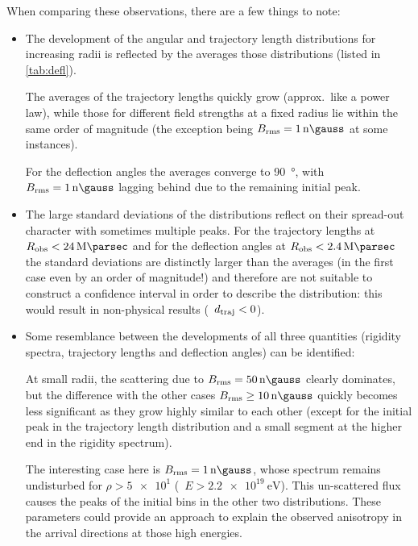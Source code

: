 When comparing these observations, there are a few things to note:
\begin{itemize}
    \item The development of the angular and trajectory length distributions
        for increasing radii is reflected by the averages those distributions
        (listed in \cref{tab:defl}).

        The averages of the trajectory lengths quickly grow (approx.~like a
        power law), while those for different field strengths at a fixed radius
        lie within the same order of magnitude (the exception being
        $\Brms=\SI{1}{\nano\gauss}$ at some instances).

        For the deflection angles the averages converge to \SI{90}{\degree},
        with $\Brms=\SI{1}{\nano\gauss}$ lagging behind due to the remaining
        initial peak.

    \item The large standard deviations of the distributions reflect on their
        spread-out character with sometimes multiple peaks. For the trajectory
        lengths at $\Robserver<\SI{24}{\mega\parsec}$ and for the deflection
        angles at $\Robserver<\SI{2.4}{\mega\parsec}$ the standard deviations
        are distinctly larger than the averages (in the first case even by an
        order of magnitude!) and therefore are not suitable to construct a
        confidence interval in order to describe the distribution: this would
        result in non-physical results (\ie~$d_{\mathrm{traj}}<0$).

    \item Some resemblance between the developments of all three quantities
        (rigidity spectra, trajectory lengths and deflection angles) can be
        identified:

        At small radii, the scattering due to $\Brms=\SI{50}{\nano\gauss}$
        clearly dominates, but the difference with the other cases
        $\Brms\ge\SI{10}{\nano\gauss}$ quickly becomes less significant as they
        grow highly similar to each other (except for the initial peak in the
        trajectory length distribution and a small segment at the higher end in
        the rigidity spectrum).

        The interesting case here is $\Brms=\SI{1}{\nano\gauss}$, whose
        spectrum remains undisturbed for $\rho>\num{5e1}$
        (\ie~$E>\SI{2.2e19}{\eV}$). This un-scattered flux causes the peaks of
        the initial bins in the other two distributions. These parameters
        could provide an approach to explain the observed anisotropy in the
        arrival directions at those high energies.

\end{itemize}

